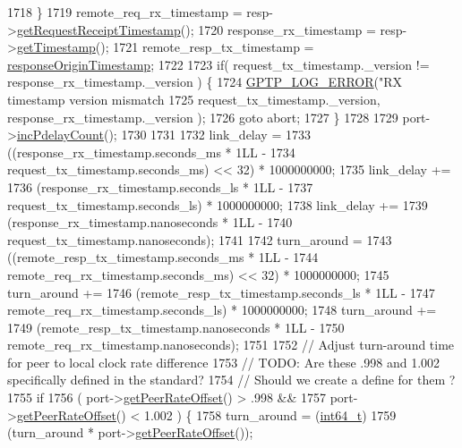 \begin{DoxyCode}
{{{{{{{{1718     \}
1719     remote\_req\_rx\_timestamp = resp->\hyperlink{class_p_t_p_message_path_delay_resp_a12ed80e37072923c206440c8ef3cc36c}{getRequestReceiptTimestamp}();
1720     response\_rx\_timestamp = resp->\hyperlink{class_p_t_p_message_common_a0bdaf174c565b4d10499011885dde906}{getTimestamp}();
1721     remote\_resp\_tx\_timestamp = \hyperlink{class_p_t_p_message_path_delay_resp_follow_up_ace95ddb3f03eb3b4fcf8f73281dc0ee3}{responseOriginTimestamp};
1722 
1723     \textcolor{keywordflow}{if}( request\_tx\_timestamp.\_version != response\_rx\_timestamp.\_version ) \{
1724         \hyperlink{gptp__log_8hpp_afefbb1009717c128012bfeed94842987}{GPTP\_LOG\_ERROR}(\textcolor{stringliteral}{"RX timestamp version mismatch %
1725                 request\_tx\_timestamp.\_version, response\_rx\_timestamp.\_version );
1726         \textcolor{keywordflow}{goto} abort;
1727     \}
1728 
1729     port->\hyperlink{class_common_port_a7d0d2b5b78e5c0847b37753bb359d6a4}{incPdelayCount}();
1730 
1731 
1732     link\_delay =
1733         ((response\_rx\_timestamp.seconds\_ms * 1LL -
1734           request\_tx\_timestamp.seconds\_ms) << 32) * 1000000000;
1735     link\_delay +=
1736         (response\_rx\_timestamp.seconds\_ls * 1LL -
1737          request\_tx\_timestamp.seconds\_ls) * 1000000000;
1738     link\_delay +=
1739         (response\_rx\_timestamp.nanoseconds * 1LL -
1740          request\_tx\_timestamp.nanoseconds);
1741 
1742     turn\_around =
1743         ((remote\_resp\_tx\_timestamp.seconds\_ms * 1LL -
1744           remote\_req\_rx\_timestamp.seconds\_ms) << 32) * 1000000000;
1745     turn\_around +=
1746         (remote\_resp\_tx\_timestamp.seconds\_ls * 1LL -
1747          remote\_req\_rx\_timestamp.seconds\_ls) * 1000000000;
1748     turn\_around +=
1749         (remote\_resp\_tx\_timestamp.nanoseconds * 1LL -
1750          remote\_req\_rx\_timestamp.nanoseconds);
1751 
1752     \textcolor{comment}{// Adjust turn-around time for peer to local clock rate difference}
1753     \textcolor{comment}{// TODO: Are these .998 and 1.002 specifically defined in the standard?}
1754     \textcolor{comment}{// Should we create a define for them ?}
1755     \textcolor{keywordflow}{if}
1756         ( port->\hyperlink{class_common_port_afc63c3fbddbf777d6e2792f1d27e35e2}{getPeerRateOffset}() > .998 &&
1757           port->\hyperlink{class_common_port_afc63c3fbddbf777d6e2792f1d27e35e2}{getPeerRateOffset}() < 1.002 ) \{
1758         turn\_around = (\hyperlink{parse_8c_a67a9885ef4908cb72ce26d75b694386c}{int64\_t})
1759             (turn\_around * port->\hyperlink{class_common_port_afc63c3fbddbf777d6e2792f1d27e35e2}{getPeerRateOffset}());
}}}}}}}}}
\end{DoxyCode}
